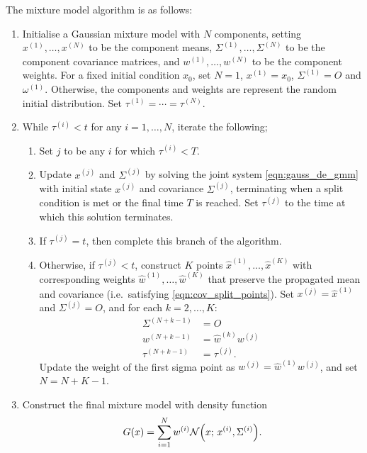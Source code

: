The mixture model algorithm is as follows:
\begin{enumerate}
	\item Initialise a Gaussian mixture model with \(N\) components, setting \(x^{(1)},\dotsc, x^{(N)}\) to be the component means, \(\Sigma^{(1)}, \dotsc, \Sigma^{(N)}\) to be the component covariance matrices, and \(w^{(1)}, \dotsc, w^{(N)}\) to be the component weights.
	      For a fixed initial condition \(x_0\), set \(N = 1\), \(x^{(1)} = x_0\), \(\Sigma^{(1)} = O\) and \(\omega^{(1)}\).
	      Otherwise, the components and weights are represent the random initial distribution.
	      Set \(\tau^{(1)} = \dotsb = \tau^{(N)}\).

	\item While \(\tau^{(i)} < t\) for any \(i = 1,\dotsc, N\), iterate the following;

	      \begin{enumerate}
		      \item Set \(j\) to be any \(i\) for which \(\tau^{(i)} < T\).

		      \item Update \(x^{(j)}\) and \(\Sigma^{(j)}\) by solving the joint system \cref{eqn:gauss_de_gmm} with initial state \(x^{(j)}\) and covariance \(\Sigma^{(j)}\), terminating when a split condition is met or the final time \(T\) is reached.
		            Set \(\tau^{(j)}\) to the time at which this solution terminates.

		      \item If \(\tau^{(j)} = t\), then complete this branch of the algorithm.

		      \item Otherwise, if \(\tau^{(j)} < t\), construct \(K\) points \(\hat{x}^{(1)},\dotsc,\hat{x}^{(K)}\) with corresponding weights \(\hat{w}^{(1)}, \dotsc, \hat{w}^{(K)}\) that preserve the propagated mean and covariance (i.e.\ satisfying \cref{eqn:cov_split_points}).
		            Set \(x^{(j)} = \hat{x}^{(1)}\) and \(\Sigma^{(j)} = O\), and for each \(k = 2,\dotsc,K\):
		            \begin{align*}
			            \Sigma^{(N + k - 1)} & = O                     \\
			            w^{(N + k - 1)}      & = \hat{w}^{(k)} w^{(j)} \\
			            \tau^{(N + k - 1)}   & = \tau^{(j)}.
		            \end{align*}
		            Update the weight of the first sigma point as \(w^{(j)} = \hat{w}^{(1)} w^{(j)}\), and set \(N = N + K - 1\).
	      \end{enumerate}

	\item Construct the final mixture model with density function
	      \[
		      G\!\left(x\right) = \sum_{i=1}^{N}{w^{(i)}\mathcal{N}\!\left(x; \, x^{(i)}, \Sigma^{(i)}\right)}.
	      \]

\end{enumerate}

